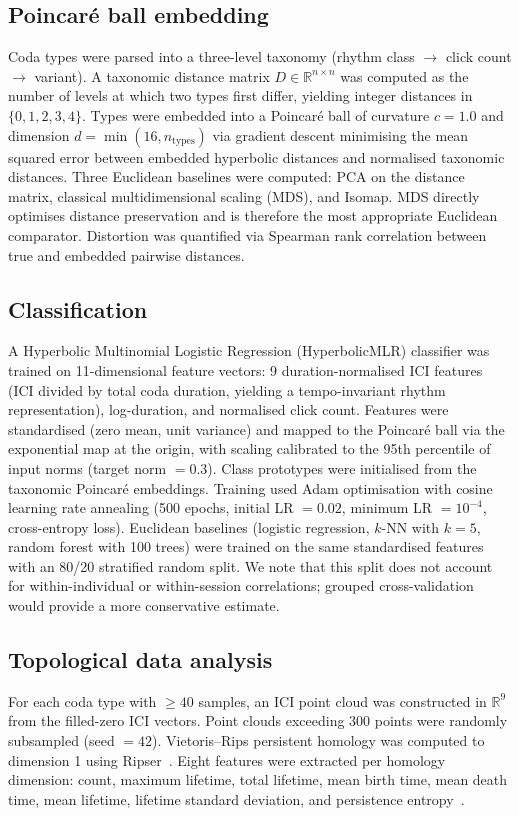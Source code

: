 \documentclass[11pt,a4paper]{article}
\begin{document}
\subsection{Poincar\'e ball embedding}
Coda types were parsed into a three-level taxonomy (rhythm class $\to$
click count $\to$ variant). A taxonomic distance matrix $D \in
\mathbb{R}^{n \times n}$ was computed as the number of levels at which
two types first differ, yielding integer distances in $\{0, 1, 2, 3, 4\}$.
Types were embedded into a Poincar\'e ball of curvature $c = 1.0$ and
dimension $d = \min(16, n_\mathrm{types})$ via gradient descent
minimising the mean squared error between embedded hyperbolic distances
and normalised taxonomic distances. Three Euclidean baselines were
computed: PCA on the distance matrix, classical multidimensional scaling
(MDS), and Isomap. MDS directly optimises distance preservation and is
therefore the most appropriate Euclidean comparator. Distortion was
quantified via Spearman rank correlation between true and embedded
pairwise distances.

\subsection{Classification}
A Hyperbolic Multinomial Logistic Regression (HyperbolicMLR) classifier
was trained on 11-dimensional feature vectors: 9 duration-normalised ICI
features (ICI divided by total coda duration, yielding a
tempo-invariant rhythm representation), log-duration, and normalised
click count. Features were standardised (zero mean, unit variance) and
mapped to the Poincar\'e ball via the exponential map at the origin,
with scaling calibrated to the 95th percentile of input norms (target
norm $= 0.3$). Class prototypes were initialised from the taxonomic
Poincar\'e embeddings. Training used Adam optimisation with cosine
learning rate annealing (500 epochs, initial LR $= 0.02$, minimum LR
$= 10^{-4}$, cross-entropy loss). Euclidean baselines (logistic
regression, $k$-NN with $k = 5$, random forest with 100 trees) were
trained on the same standardised features with an 80/20 stratified
random split. We note that this split does not account for
within-individual or within-session correlations; grouped
cross-validation would provide a more conservative estimate.

\subsection{Topological data analysis}
For each coda type with $\geq 40$ samples, an ICI point cloud was
constructed in $\mathbb{R}^9$ from the filled-zero ICI vectors. Point
clouds exceeding 300 points were randomly subsampled (seed $= 42$).
Vietoris--Rips persistent homology was computed to dimension 1 using
Ripser~\citep{Bauer2021,Tralie2018}. Eight features were extracted per
homology dimension: count, maximum lifetime, total lifetime, mean birth
time, mean death time, mean lifetime, lifetime standard deviation, and
persistence entropy~\citep{Otter2017}.
\end{document}
